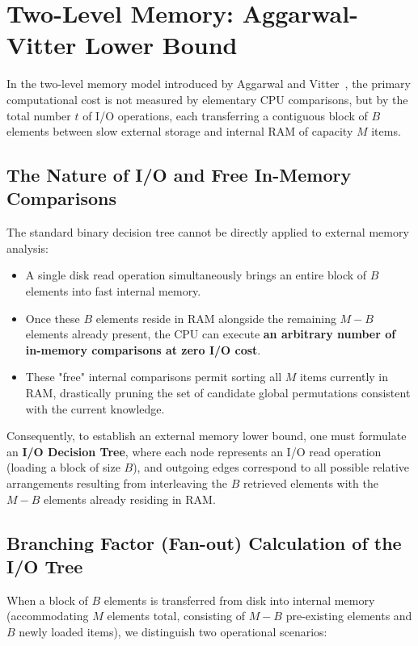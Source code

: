 \FloatBarrier
\section{Two-Level Memory: Aggarwal-Vitter Lower Bound}
\label{sec:aggarwal-vitter-lower-bound}

In the two-level memory model introduced by Aggarwal and Vitter~\cite{aggarwal1988}, the primary computational cost is not measured by elementary CPU comparisons, but by the total number $t$ of I/O operations, each transferring a contiguous block of $B$ elements between slow external storage and internal RAM of capacity $M$ items.

\subsection{The Nature of I/O and Free In-Memory Comparisons}
\label{subsec:free-comparisons-intuition}

The standard binary decision tree cannot be directly applied to external memory analysis:
\begin{itemize}
  \item A single disk read operation simultaneously brings an entire block of $B$ elements into fast internal memory.
  \item Once these $B$ elements reside in RAM alongside the remaining $M - B$ elements already present, the CPU can execute \textbf{an arbitrary number of in-memory comparisons at zero I/O cost}.
  \item These "free" internal comparisons permit sorting all $M$ items currently in RAM, drastically pruning the set of candidate global permutations consistent with the current knowledge.
\end{itemize}

Consequently, to establish an external memory lower bound, one must formulate an \textbf{I/O Decision Tree}, where each node represents an I/O read operation (loading a block of size $B$), and outgoing edges correspond to all possible relative arrangements resulting from interleaving the $B$ retrieved elements with the $M - B$ elements already residing in RAM.

\subsection{Branching Factor (Fan-out) Calculation of the I/O Tree}
\label{subsec:fanout-calculation}

When a block of $B$ elements is transferred from disk into internal memory (accommodating $M$ elements total, consisting of $M - B$ pre-existing elements and $B$ newly loaded items), we distinguish two operational scenarios:

